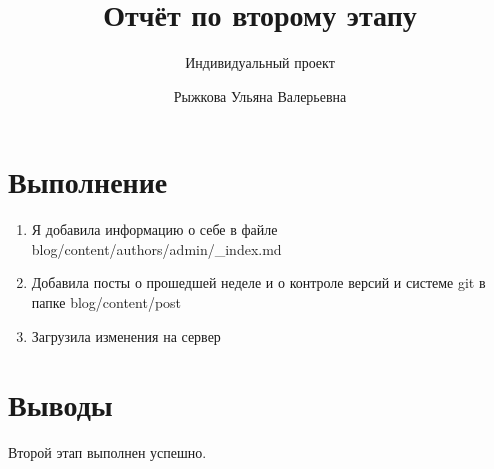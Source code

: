 \documentclass[
  12pt,
  a4paper,
]{scrreprt}
\title{Отчёт по второму этапу}
\subtitle{Индивидуальный проект}
\author{Рыжкова Ульяна Валерьевна}
\date{}
\begin{document}
\maketitle

\renewcommand*\contentsname{Содержание}
{
\setcounter{tocdepth}{2}
\tableofcontents
}
\listoffigures
\listoftables
{}
\hypertarget{ux432ux44bux43fux43eux43bux43dux435ux43dux438ux435}{%
\chapter{Выполнение}\label{ux432ux44bux43fux43eux43bux43dux435ux43dux438ux435}}

\begin{enumerate}
\def\labelenumi{\arabic{enumi}.}
\item
  Я добавила информацию о себе в файле
  blog/content/authors/admin/\_index.md
\item
  Добавила посты о прошедшей неделе и о контроле версий и системе git в
  папке blog/content/post
\item
  Загрузила изменения на сервер
\end{enumerate}

\hypertarget{ux432ux44bux432ux43eux434ux44b}{%
\chapter{Выводы}\label{ux432ux44bux432ux43eux434ux44b}}

Второй этап выполнен успешно.

\printbibliography
\end{document}
